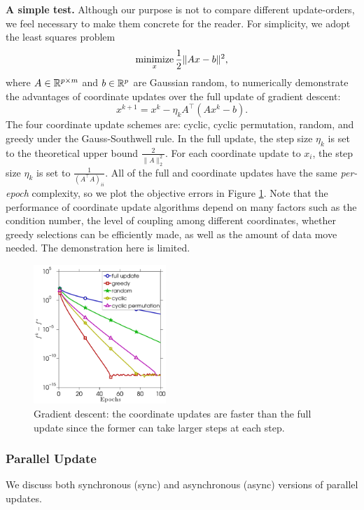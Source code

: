 \textbf{A simple test.} Although our purpose is not to compare different update-orders, we feel necessary to make them concrete for the reader. For simplicity, we adopt the least squares problem
$$\operatorname*{minimize}_{x} \frac{1}{2} \|A x - b\|^2,$$
where $A \in \mathbb{R}^{p \times m}$ and $b \in \mathbb{R}^p$ are Gaussian random, to numerically demonstrate the advantages of coordinate updates over the  full update of  gradient descent:
$$x^{k+1} = x^k - \eta_k A^{\top}(A x^k - b).$$
The four coordinate update schemes are: cyclic, cyclic permutation, random, and greedy under the Gauss-Southwell rule. 
In the full update, the step size $\eta_k$ is set to the theoretical upper bound $\frac{2}{\|A\|_2^2}$. For each coordinate update to $x_i$, the step size $\eta_k$ is set to $\frac{1}{(A^{\top}A)_{ii}}$. All of the full and coordinate updates have the same \emph{per-epoch} complexity, so we plot the objective errors in Figure \ref{fig:ls_full_vs_coord}. 
Note that the performance of coordinate update algorithms depend on many factors such as the condition number, the level of coupling among different coordinates, whether greedy selections can be efficiently made, as well as the amount of data move needed. The demonstration here is limited. 
\begin{figure}[!htbp] \centering
\includegraphics[width=50mm]{./figs/randn_matrix_cropped}

\caption{Gradient descent: the coordinate updates are faster than the full update since the former can take larger steps at each step.}
\label{fig:ls_full_vs_coord}
\end{figure}



\subsubsection{Parallel Update} We discuss both synchronous (sync) and asynchronous (async) versions of parallel updates.

